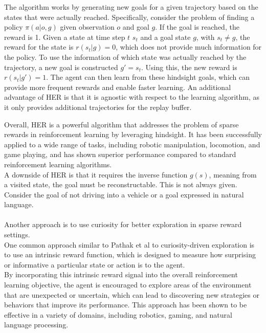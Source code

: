 The algorithm works by generating new goals for a given trajectory based on the states that were actually reached.
Specifically, consider the problem of finding a policy $\pi(a|o, g)$ given observation $o$ and goal $g$.
If the goal is reached, the reward is 1. Given a state at time step $t$ $s_t$ and a goal state $g$, with $s_t \neq g$,
the reward for the state is $r(s_t|g) = 0$, which does not provide much information for the policy.
To use the information of which state was actually reached by the trajectory, a new goal is constructed $g' = s_t$. Using this, the new reward is $r(s_t|g') = 1$.
The agent can then learn from these hindsight goals, which can provide more frequent rewards and enable faster learning. An additional advantage of HER is that it is agnostic with respect to the learning algorithm, as it only provides additional trajectories for the replay buffer.

Overall, HER is a powerful algorithm that addresses the problem of sparse rewards in reinforcement learning by leveraging hindsight. It has been successfully applied to a wide range of tasks, 
including robotic manipulation, locomotion, and game playing, and has shown superior performance compared to standard reinforcement learning algorithms.\\

A downside of HER is that it requires the inverse function $g(s)$, meaning from a visited state, the goal must be reconstructable. This is not always given.
Consider the goal of not driving into a vehicle or a goal expressed in natural language. \\ \\

Another approach is to use curiosity for better exploration in sparse reward settings.\\

One common approach similar to Pathak et al \cite{pathak2017curiositydriven} to curiosity-driven exploration is to use an intrinsic reward function, which is designed to 
measure how surprising or informative a particular 
state or action is to the agent. \\

By incorporating this intrinsic reward signal into the overall reinforcement learning objective, the agent is encouraged to explore areas of the environment that are 
unexpected or uncertain, which can lead to discovering new strategies or behaviors that improve its performance. This approach has been shown to be effective in a variety of 
domains, including robotics, gaming, and natural language processing.\\


